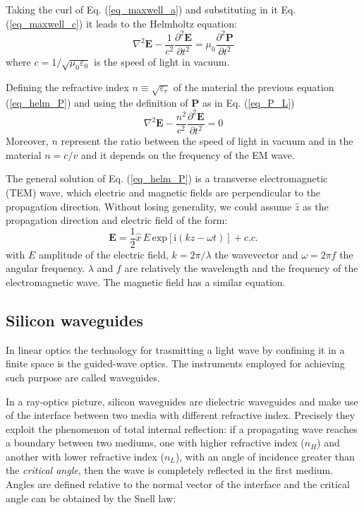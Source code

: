 \documentclass[12pt,a4paper,twoside]{article}
\begin{document}
Taking the curl of Eq. (\ref{eq_maxwell_a}) and substituting in it Eq. (\ref{eq_maxwell_c}) it leads to the Helmholtz equation:
\begin{equation}
\nabla^2 \textbf{E} - \frac{1}{c^2}\frac{\partial^2 \textbf{E}}{\partial t^2} = \mu_0\frac{\partial^2 \textbf{P}}{\partial t^2}
\label{eq_helm_P}
\end{equation}
where $c = 1/\sqrt{\mu_0 \varepsilon_0}$ is the speed of light in vacuum.

Defining the refractive index $n \equiv \sqrt{\varepsilon_r}$ of the material the previous equation (\ref{eq_helm_P}) and using the definition of \textbf{P} as in Eq. (\ref{eq_P_L})
\begin{equation}
	\nabla^2 \textbf{E} - \frac{n^2}{c^2}\frac{\partial^2 \textbf{E}}{\partial t^2} = 0
	\label{eq_helm_lin}
\end{equation}
Moreover, $n$ represent the ratio between the speed of light in vacuum and in the material $n = c/v$ and it depends on the frequency of the EM wave.

The general solution of Eq. (\ref{eq_helm_P}) is a transverse electromagnetic (TEM) wave, which electric and magnetic fields are perpendicular to the propagation direction.
Without losing generality, we could assume $\hat{z}$ as the propagation direction and electric field of the form:
\begin{equation}
	\textbf{E} = \frac{1}{2}\hat{x}\,E\,\mathrm{exp}[\mathrm{i}(kz-\omega t)] + c.c.
	\label{eq_wave}
\end{equation}
with $E$ amplitude of the electric field, $k = 2\pi/\lambda$ the wavevector and $\omega = 2\pi f$ the angular frequency. $\lambda$ and $f$ are relatively the wavelength and the frequency of the electromagnetic wave.
The magnetic field has a similar equation.

\subsection{Silicon waveguides}
In linear optics the technology for trasmitting a light wave by confining it in a finite space is the guided-wave optics.
The instruments employed for achieving such purpose are called waveguides.

In a ray-optics picture, silicon waveguides are dielectric waveguides and make use of the interface between two media with different refractive index.
Precisely they exploit the phenomenon of total internal reflection: if a propagating wave reaches a boundary between two mediums, one with higher refractive index ($n_H$) and another with lower refractive index ($n_L$), with an angle of incidence greater than the \textit{critical angle}, then the wave is completely reflected in the first medium.
Angles are defined relative to the normal vector of the interface and the critical angle can be obtained by the Snell law:
\end{document}
